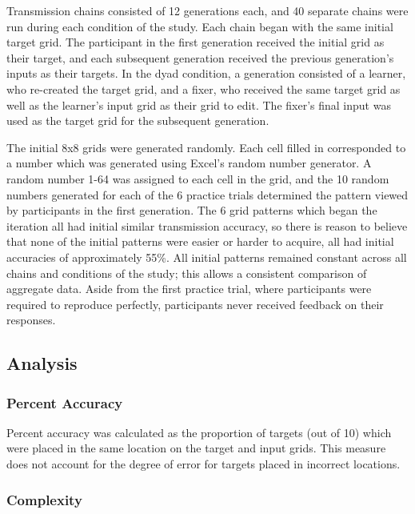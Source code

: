 \documentclass[10pt, letterpaper]{article}
\begin{document}
Transmission chains consisted of 12 generations each, and 40 separate
chains were run during each condition of the study. Each chain began
with the same initial target grid. The participant in the first
generation received the initial grid as their target, and each
subsequent generation received the previous generation's inputs as their
targets. In the dyad condition, a generation consisted of a learner, who
re-created the target grid, and a fixer, who received the same target
grid as well as the learner's input grid as their grid to edit. The
fixer's final input was used as the target grid for the subsequent
generation.

The initial 8x8 grids were generated randomly. Each cell filled in
corresponded to a number which was generated using Excel's random number
generator. A random number 1-64 was assigned to each cell in the grid,
and the 10 random numbers generated for each of the 6 practice trials
determined the pattern viewed by participants in the first generation.
The 6 grid patterns which began the iteration all had initial similar
transmission accuracy, so there is reason to believe that none of the
initial patterns were easier or harder to acquire, all had initial
accuracies of approximately 55\%. All initial patterns remained constant
across all chains and conditions of the study; this allows a consistent
comparison of aggregate data. Aside from the first practice trial, where
participants were required to reproduce perfectly, participants never
received feedback on their responses.

\subsection{Analysis}\label{analysis}

\subsubsection{Percent Accuracy}\label{percent-accuracy}

Percent accuracy was calculated as the proportion of targets (out of 10)
which were placed in the same location on the target and input grids.
This measure does not account for the degree of error for targets placed
in incorrect locations.

\subsubsection{Complexity}\label{complexity}
\end{document}
